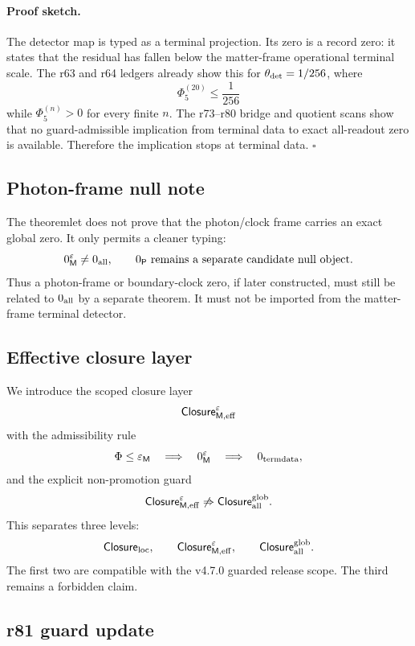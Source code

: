 \paragraph{Proof sketch.}
The detector map is typed as a terminal projection.  Its zero is a record zero: it states
that the residual has fallen below the matter-frame operational terminal scale.  The r63
and r64 ledgers already show this for \(\theta_{\rm det}=1/256\), where
\[
\Phi_5^{(20)}\leq \frac1{256}
\]
while \(\Phi_5^{(n)}>0\) for every finite \(n\).  The r73--r80 bridge and quotient scans
show that no guard-admissible implication from terminal data to exact all-readout zero is
available.  Therefore the implication stops at terminal data. \(\square\)

\subsection*{Photon-frame null note}
\label{subsec:r81-photon-frame-null-note}

The theoremlet does not prove that the photon/clock frame carries an exact global zero.
It only permits a cleaner typing:
\[
0_{\mathsf M}^{\varepsilon}\neq 0_{\rm all},
\qquad
0_{\mathsf P}\text{ remains a separate candidate null object.}
\]
Thus a photon-frame or boundary-clock zero, if later constructed, must still be related to
\(0_{\rm all}\) by a separate theorem.  It must not be imported from the matter-frame
terminal detector.

\subsection*{Effective closure layer}
\label{subsec:r81-effective-closure-layer}

We introduce the scoped closure layer
\[
\mathsf{Closure}_{\mathsf M,\rm eff}^{\varepsilon}
\]
with the admissibility rule
\[
\Phi\leq\varepsilon_{\mathsf M}
\quad\Longrightarrow\quad
0_{\mathsf M}^{\varepsilon}\quad\Longrightarrow\quad 0_{\rm termdata},
\]
and the explicit non-promotion guard
\[
\mathsf{Closure}_{\mathsf M,\rm eff}^{\varepsilon}
\not\Rightarrow
\mathsf{Closure}_{\rm all}^{\rm glob}.
\]
This separates three levels:
\[
\mathsf{Closure}_{\rm loc},
\qquad
\mathsf{Closure}_{\mathsf M,\rm eff}^{\varepsilon},
\qquad
\mathsf{Closure}_{\rm all}^{\rm glob}.
\]
The first two are compatible with the v4.7.0 guarded release scope.  The third remains a
forbidden claim.

\subsection*{r81 guard update}
\label{subsec:r81-guard-update}

